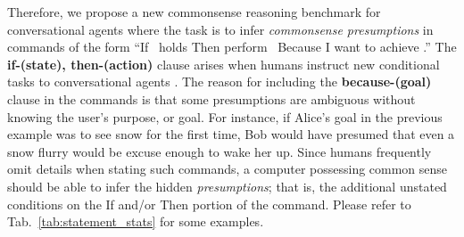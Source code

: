 Therefore, we propose a new commonsense reasoning benchmark for conversational agents where the task is to
infer \emph{commonsense presumptions} in commands of the form ``If \textState~holds Then perform \textAction~Because I want to achieve \textGoal.'' The {\bf if-(state), then-(action)} clause arises when humans instruct new conditional tasks to conversational agents \cite{azaria2016instructable, labutov2018lia}. 
The reason for including the \textbf{because-(goal)} clause in the commands is that some presumptions are ambiguous without knowing the user's purpose, or goal. For instance, if Alice's goal in the previous example was to see snow for the first time, Bob would have presumed that even a snow flurry would be excuse enough to wake her up. Since humans frequently omit details when stating such commands, a computer possessing common sense
should be able to infer the hidden \emph{presumptions}; that is, the additional unstated conditions on the If and/or Then portion of the command. Please refer to Tab.~\ref{tab:statement_stats} for some examples. %


